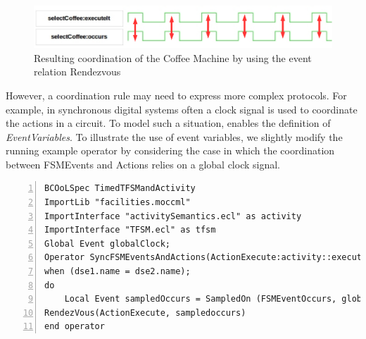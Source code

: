 	\begin{figure}[h]
		\center
		\includegraphics[width=.8\textwidth]{bcool/figs/runningrdv}
		\caption{Resulting coordination of the Coffee Machine by using the event relation Rendezvous}
		\label{fig:runningrdv}
	\end{figure}
		
However, a coordination rule may need to express more complex protocols. For example, in synchronous digital systems often a clock signal is used to coordinate the actions in a circuit. To model such a situation, \bcool enables the definition of \emph{EventVariables}. To illustrate the use of event variables, we slightly modify the running example operator by considering the case in which the coordination between FSMEvents and Actions relies on a global clock signal.
	
\begin{lstlisting}[language=bcool,
caption={Synchronized product operator between the TFSM and Activity languages by using Event Variables},
label={lst:bcoolrunningexampletimed}, 
basicstyle=\scriptsize\ttfamily, backgroundcolor=\color{LGrey}, numbers=left, xleftmargin=2pt]
BCOoLSpec TimedTFSMandActivity
ImportLib "facilities.moccml"
ImportInterface "activitySemantics.ecl" as activity
ImportInterface "TFSM.ecl" as tfsm
Global Event globalClock;
Operator SyncFSMEventsAndActions(ActionExecute:activity::executeIt, FSMEventOccurs:tfsm::occurs)
when (dse1.name = dse2.name);
do
	Local Event sampledOccurs = SampledOn (FSMEventOccurs, globalClock);
RendezVous(ActionExecute, sampledoccurs)
end operator
\end{lstlisting}
			
